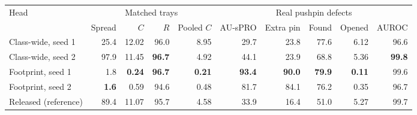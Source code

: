 \begin{tabular}{lrrrrrrrrr}
\toprule
Head & \multicolumn{4}{c}{Matched trays} & \multicolumn{5}{c}{Real pushpin defects} \\
\cmidrule(lr){2-5}\cmidrule(lr){6-10}
 & Spread & $C$ & $R$ & Pooled $C$ & AU-sPRO & Extra pin & Found & Opened & AUROC \\
\midrule
Class-wide, seed 1 & 25.4 & 12.02 & 96.0 & 8.95 & 29.7 & 23.8 & 77.6 & 6.12 & 96.6 \\
Class-wide, seed 2 & 97.9 & 11.45 & \textbf{96.7} & 4.92 & 44.1 & 23.9 & 68.8 & 5.36 & \textbf{99.8} \\
Footprint, seed 1 & 1.8 & \textbf{0.24} & \textbf{96.7} & \textbf{0.21} & \textbf{93.4} & \textbf{90.0} & \textbf{79.9} & \textbf{0.11} & 99.6 \\
Footprint, seed 2 & \textbf{1.6} & 0.59 & 94.6 & 0.48 & 81.7 & 84.1 & 76.2 & 0.35 & 96.7 \\
\midrule
Released (reference) & 89.4 & 11.07 & 95.7 & 4.58 & 33.9 & 16.4 & 51.0 & 5.27 & 99.7 \\
\bottomrule
\end{tabular}
